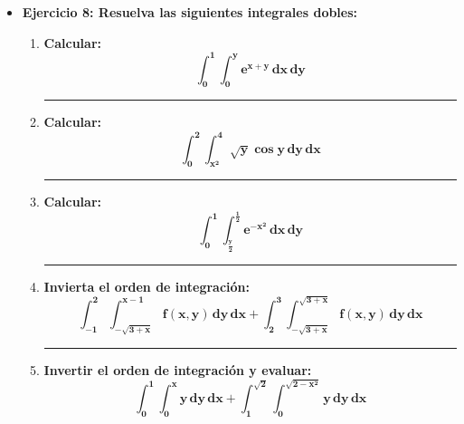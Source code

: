 \documentclass[12pt]{article}
\begin{document}
\begin{itemize}
        
        \item \textbf{Ejercicio 8: Resuelva las siguientes integrales dobles:} \vspace{0.5cm}
            \begin{enumerate}
                \hrule
                \item \textbf{Calcular:} \[\bm{\int_{0}^{1} \int_{0}^{y} e^{x + y} \, dx \, dy}\]
                

                \hrule
                \item \textbf{Calcular:} \[\bm{\int_{0}^{2} \int_{x^2}^{4} \sqrt{y} \cos{y} \, dy \, dx}\]
                

                \hrule
                \item \textbf{Calcular:} \[\bm{\int_{0}^{1} \int_{\frac{y}{2}}^{\frac{1}{2}} e^{-x^2} \, dx \, dy}\]
                

                \hrule
                \item \textbf{Invierta el orden de integración:} \[\bm{\int_{-1}^{2} \int_{-\sqrt{3 + x}}^{x - 1} f(x, y) \, dy \, dx + \int_{2}^{3} \int_{-\sqrt{3 + x}}^{\sqrt{3 + x}} f(x, y) \, dy \, dx}\]
                

                \hrule
                \item \textbf{Invertir el orden de integración y evaluar:} \[\bm{\int_{0}^{1} \int_{0}^{x} y \, dy \, dx + \int_{1}^{\sqrt{2}} \int_{0}^{\sqrt{2 - x^2}} y \, dy \, dx}\]
                

            \end{enumerate}


    \end{itemize}
\end{document}
